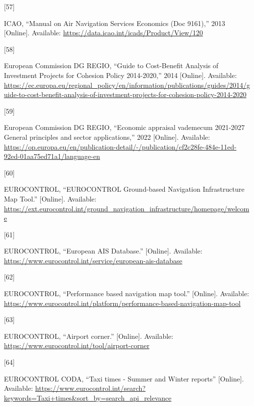 \documentclass[
  11pt,
  a4paper,
]{book}
\newlength{\cslhangindent}
\newlength{\csllabelwidth}
\newlength{\cslentryspacingunit} %
\newenvironment{CSLReferences}[2] %
 {%
  \setlength{\parindent}{0pt}
  \ifodd #1
  \let\oldpar\par
  \def\par{\hangindent=\cslhangindent\oldpar}
  \fi
  \setlength{\parskip}{#2\cslentryspacingunit}
 }%
 {}
\newcommand{\CSLLeftMargin}[1]{\parbox[t]{\csllabelwidth}{#1}}
\newcommand{\CSLRightInline}[1]{\parbox[t]{\linewidth - \csllabelwidth}{#1}\break}
\begin{document}
\begin{CSLReferences}{0}{0}
\leavevmode{}%
\CSLLeftMargin{{[}57{]} }%
\CSLRightInline{ICAO, {``Manual on {Air Navigation Services Economics}
({Doc} 9161),''} 2013 {[}Online{]}. Available:
\url{https://data.icao.int/icads/Product/View/120}}

\leavevmode{}%
\CSLLeftMargin{{[}58{]} }%
\CSLRightInline{European Commission DG REGIO, {``Guide to {Cost-Benefit
Analysis} of {Investment Projects} for {Cohesion Policy} 2014-2020,''}
2014 {[}Online{]}. Available:
\url{https://ec.europa.eu/regional_policy/en/information/publications/guides/2014/guide-to-cost-benefit-analysis-of-investment-projects-for-cohesion-policy-2014-2020}}

\leavevmode{}%
\CSLLeftMargin{{[}59{]} }%
\CSLRightInline{European Commission DG REGIO, {``Economic appraisal
vademecum 2021-2027 {General} principles and sector applications,''}
2022 {[}Online{]}. Available:
\url{https://op.europa.eu/en/publication-detail/-/publication/cf2c28fe-484e-11ed-92ed-01aa75ed71a1/language-en}}

\leavevmode{}%
\CSLLeftMargin{{[}60{]} }%
\CSLRightInline{EUROCONTROL, {``{EUROCONTROL Ground-based Navigation
Infrastructure Map Tool}.''} {[}Online{]}. Available:
\url{https://ext.eurocontrol.int/ground_navigation_infrastructure/homepage/welcome}}

\leavevmode{}%
\CSLLeftMargin{{[}61{]} }%
\CSLRightInline{EUROCONTROL, {``European {AIS Database}.''}
{[}Online{]}. Available:
\url{https://www.eurocontrol.int/service/european-ais-database}}

\leavevmode{}%
\CSLLeftMargin{{[}62{]} }%
\CSLRightInline{EUROCONTROL, {``Performance based navigation map
tool.''} {[}Online{]}. Available:
\url{https://www.eurocontrol.int/platform/performance-based-navigation-map-tool}}

\leavevmode{}%
\CSLLeftMargin{{[}63{]} }%
\CSLRightInline{EUROCONTROL, {``Airport corner.''} {[}Online{]}.
Available: \url{https://www.eurocontrol.int/tool/airport-corner}}

\leavevmode{}%
\CSLLeftMargin{{[}64{]} }%
\CSLRightInline{EUROCONTROL CODA, {``Taxi times - {Summer} and {Winter}
reports''} {[}Online{]}. Available:
\url{https://www.eurocontrol.int/search?keywords=Taxi+times\&sort_by=search_api_relevance}}


\end{CSLReferences}
\end{document}
